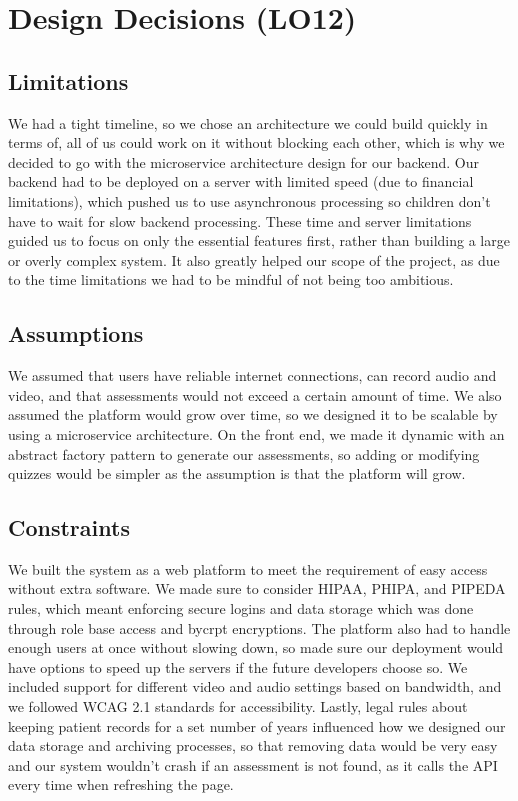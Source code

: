 \documentclass{article}
\begin{document}
\newpage

\section{Design Decisions (LO12)}

\subsection{Limitations}
\hspace{2em}We had a tight timeline, so we chose an architecture we could build quickly in terms of, all of us could work 
on it without blocking each other, which is why we decided to go with the microservice architecture design for our backend.
Our backend had to be deployed on a server with limited speed (due to financial limitations), which pushed us to use asynchronous processing 
so children don't have to wait for slow backend processing. These time and server limitations guided us to focus on only 
the essential features first, rather than building a large or overly complex system. It also greatly helped our scope of the project, as due to the time limitations
we had to be mindful of not being too ambitious.

\subsection{Assumptions}
\hspace{2em}We assumed that users have reliable internet connections, can record audio and video, and that assessments would 
not exceed a certain amount of time. We also assumed the platform would grow over time, so we designed it to be 
scalable by using a microservice architecture. On the front end, we made it dynamic with an abstract 
factory pattern to generate our assessments, so adding or modifying quizzes would be simpler as the assumption is that the platform will grow. 

\subsection{Constraints}
\hspace{2em}We built the system as a web platform to meet the requirement of easy access without extra software. We made sure 
to consider HIPAA, PHIPA, and PIPEDA rules, which meant enforcing secure logins and data storage which was done through role base access and bycrpt encryptions. 
The platform also had to handle enough users at once without slowing down, so made sure our deployment would have options to speed up the servers if the 
future developers choose so. We included support for different video and audio settings based on bandwidth, and we followed 
WCAG 2.1 standards for accessibility. Lastly, legal rules about keeping patient records for a set number of years 
influenced how we designed our data storage and archiving processes, so that removing data would be very easy and our system wouldn't crash if an assessment is not found, as it calls the API every time when refreshing the page. 
\end{document}
